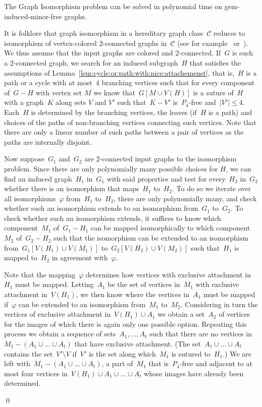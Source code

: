 \documentclass[envcountsame,envcountsect,11pt,a4paper]{llncs}
\renewenvironment{proof}{\begin{Proof}}{\qed\end{Proof}}
\begin{document}
\begin{theorem}
\label{thm:gem:iso}
The {\sc Graph Isomorphism} problem can be solved in polynomial time on gem-induced-minor-free graphs.
\end{theorem}

\begin{proof}
It is folklore that graph isomorphism in a hereditary graph class~$\mathcal{C}$ reduces to isomorphism of vertex-colored 2-connected graphs in~$\mathcal{C}$ (see for example~\cite{DBLP:conf/coco/DattaLNTW09} or~\cite{OtachiS14}).
We thus assume that the input graphs are colored and 2-connected. 
If~$G$ is such a 2-connected graph, we search for an induced subgraph~$H$ that satisfies the assumptions of
Lemma~\ref{lem:cycle:or:path:with:nice:attachemenst}, that is,~$H$ is a
path or a cycle with at most~$4$ branching vertices such that for every
component of~$G-H$ with vertex set $M$ we know that~$G[M \cup V(H)]$ is a
suture of~$H$
with a graph~$K$ along sets $V$ and $V'$ such that~$K - V'$ is~$P_4$-free and~$|V'|\leq 4$.
Each~$H$ is determined by the branching vertices, the leaves (if~$H$ is a path) and
choices of the paths of non-branching vertices connecting such vertices.
Note that there are only a linear number of such paths between a pair of vertices as the paths are internally disjoint.
 
Now suppose~$G_1$ and~$G_2$ are 2-connected input graphs to the isomorphism problem.
Since there are only polynomially many possible choices for $H$,
we can find an induced graph~$H_1$ in~$G_1$ with said properties and test for every~$H_2$ in~$G_2$ whether there is an isomorphism that maps~$H_1$ to~$H_2$.
To do so we iterate over all isomorphisms~$\varphi$ from~$H_1$ to~$H_2$,
there are only polynomially many, and check whether such an isomorphism extends to an isomorphism from~$G_1$ to~$G_2$.
To check whether such an isomorphism extends,
it suffices to know which component~$M_1$ of~$G_1-H_1$ can be mapped isomorphically to which component~$M_2$ of~$G_2-H_2$
such that the isomorphism can be extended to an isomorphism from~$G_1[V(H_1) \cup V(M_1)]$ to~$G_2[V(H_2)\cup V(M_2)]$
such that~$H_1$ is mapped to~$H_2$ in agreement with~$\varphi$.

Note that the mapping~$\varphi$ determines how vertices with exclusive attachment in~$H_1$ must be mapped. Letting~$A_1$ be the set of
vertices in~$M_1$ with exclusive attachment in~$V(H_1)$, we then know where the vertices in~$A_1$ must be mapped
if~$\varphi$ can be extended to an isomorphism from~$M_1$ to~$M_2$. Considering in turn the vertices of exclusive attachment in~$V(H_1)\cup A_1$ we obtain a set~$A_2$ of vertices for the images of which there is again only one possible option.
Repeating this process we obtain a sequence of sets~$A_1,\ldots, A_t$ such that there are no vertices in~$M_1-( A_1\cup\ldots\cup A_t)$
that have exclusive attachment. (The set~$A_1\cup\ldots\cup A_t$ contains the set~$V'\setminus V$ if~$V'$ is the set along which~$M_1$
is sutured to~$H_1$.)
We are left with~$M_1 -( A_1\cup\ldots\cup A_t)$, a part of~$M_1$ that is~$P_4$-free and adjacent to at most four vertices in~$V(H_1)\cup
A_1\cup\ldots\cup A_t$ whose images have already been determined.



\end{proof}
\end{document}
